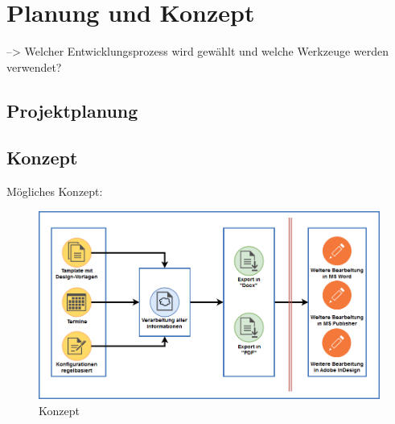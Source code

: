 \chapter{Planung und Konzept} \label{planung}
--> Welcher Entwicklungsprozess wird gewählt und welche Werkzeuge werden verwendet?


\section{Projektplanung} \label{plan:projektplan}



\section{Konzept} \label{plan:konzept}
Mögliches Konzept:
\begin{figure}[h]
	\centering
	\includegraphics[width=15cm]{bilder/konzept_1.png}
    \caption{Konzept}
    \label{img:Konzept1}
\end{figure}